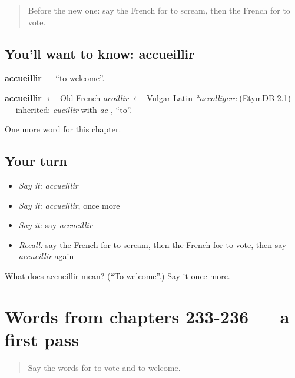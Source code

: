 \begin{quote}
Before the new one: say the French for to scream, then the French for to vote.
\end{quote}

\subsection*{You'll want to know: accueillir}
\textbf{accueillir} — \textquotedblleft{}to welcome\textquotedblright{}.

\begin{cousinweb}
\textbf{accueillir} $\leftarrow$ Old French \emph{acoillir} $\leftarrow$ Vulgar Latin \emph{*accolligere} (EtymDB 2.1) — inherited: \emph{cueillir} with \emph{ac-}, \textquotedblleft{}to\textquotedblright{}.
\end{cousinweb}

\begin{grammarlens}[title={What you've built}]
One more word for this chapter.
\end{grammarlens}

\subsection*{Your turn}
\begin{itemize}
\raggedright
  \item \emph{Say it:} \emph{accueillir}
  \item \emph{Say it:} \emph{accueillir}, once more
  \item \emph{Say it:} say \emph{accueillir}
  \item \emph{Recall:} say the French for to scream, then the French for to vote, then say \emph{accueillir} again
\end{itemize}

\begin{tcolorbox}[breakable,colback=teal!4,colframe=teal!35!black,title={Before you move on}]
What does accueillir mean? (\textquotedblleft{}To welcome\textquotedblright{}.) Say it once more.
\end{tcolorbox}
\section[(dialogue)]{Words from chapters 233-236 — a first pass}

\label{lesson:FR-R241-first-pass-words-from-chapters-233-236}



\begin{quote}
Say the words for to vote and to welcome.
\end{quote}

